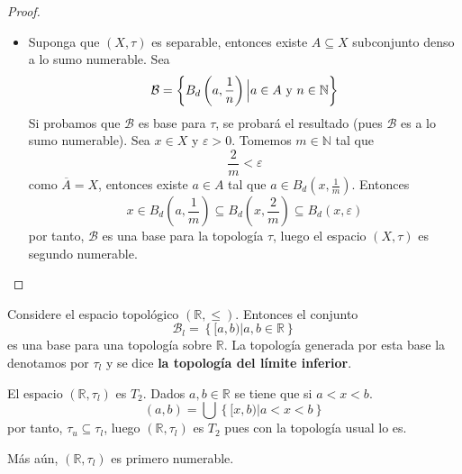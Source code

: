 \documentclass[12pt]{report}
\theoremstyle{largebreak}
\begin{document}
\begin{proof}
\begin{itemize}
            \item Suponga que $(X,\tau)$ es separable, entonces existe $A\subseteq X$ subconjunto denso a lo sumo numerable. Sea
            \begin{equation*}
                \mathcal{B}=\left\{B_d\left(a,\frac{1}{n}\right) \Big|a\in A\textup{ y }n\in\mathbb{N} \right\}
            \end{equation*}
            Si probamos que $\mathcal{B}$ es base para $\tau$, se probará el resultado (pues $\mathcal{B}$ es a lo sumo numerable). Sea $x\in X$ y $\varepsilon>0$. Tomemos $m\in\mathbb{N}$ tal que
            \begin{equation*}
                \frac{2}{m}<\varepsilon
            \end{equation*}
            como $\overline{A}=X$, entonces existe $a\in A$ tal que $a\in B_d\left(x,\frac{1}{m}\right)$. Entonces
            \begin{equation*}
                x\in B_d\left(a,\frac{1}{m}\right)\subseteq B_d\left(x,\frac{2}{m} \right)\subseteq B_d\left(x,\varepsilon\right)
            \end{equation*}
            por tanto, $\mathcal{B}$ es una base para la topología $\tau$, luego el espacio $(X,\tau)$ es segundo numerable.
        \end{itemize}
    \end{proof}

    \begin{exa}
        Considere el espacio topológico $(\mathbb{R},\leq)$. Entonces el conjunto
        \begin{equation*}
            \mathcal{B}_l=\left\{[a,b)\Big|a,b\in\mathbb{R} \right\}
        \end{equation*}
        es una base para una topología sobre $\mathbb{R}$. La topología generada por esta base la denotamos por $\tau_l$ y se dice \textbf{la topología del límite inferior}.
    \end{exa}

    \begin{exa}
        El espacio $(\mathbb{R},\tau_l)$ es $T_2$. Dados $a,b\in\mathbb{R}$ se tiene que si $a<x<b$.
        \begin{equation*}
            (a,b)=\bigcup\left\{[x,b)\Big|a<x<b \right\}
        \end{equation*}
        por tanto, $\tau_u\subseteq\tau_l$, luego $(\mathbb{R},\tau_l)$ es $T_2$ pues con la topología usual lo es.

        Más aún, $(\mathbb{R},\tau_l)$ es primero numerable.
    \end{exa}
\end{document}
